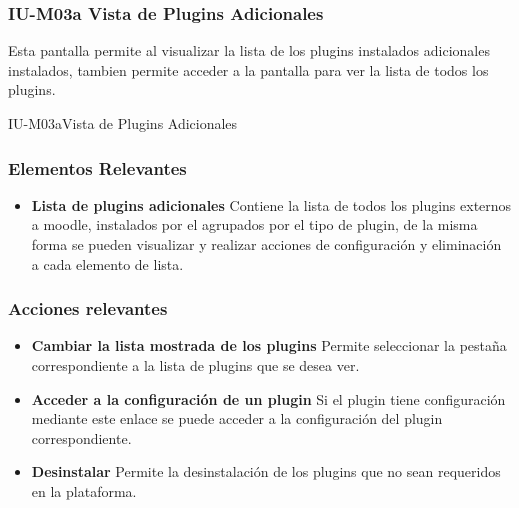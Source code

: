 
\subsubsection{IU-M03a Vista de Plugins Adicionales}

 Esta pantalla permite al  visualizar la lista de los plugins
 instalados adicionales instalados, tambien permite acceder a la pantalla
  para ver la lista de todos los plugins.

        {IU-M03a}{Vista de Plugins Adicionales}

\subsubsection{Elementos Relevantes}

    \begin{itemize}
    \item {\bf Lista de plugins adicionales}
        Contiene la lista de todos los plugins externos a moodle, instalados por
        el  agrupados por el tipo de plugin, de la misma
        forma se pueden visualizar y realizar acciones de configuración y eliminación
        a cada elemento de lista.
    \end{itemize}

\subsubsection{Acciones relevantes}

    \begin{itemize}
    \item {\bf Cambiar la lista mostrada de los plugins}
        Permite seleccionar la pestaña correspondiente a la lista de plugins
        que se desea ver.
    \item {\bf Acceder a la configuración de un plugin}
        Si el plugin tiene configuración mediante este enlace se puede acceder
        a la configuración del plugin correspondiente.
    \item {\bf Desinstalar}
        Permite la desinstalación de los plugins que no sean requeridos en la
        plataforma.
    \end{itemize}

\clearpage
